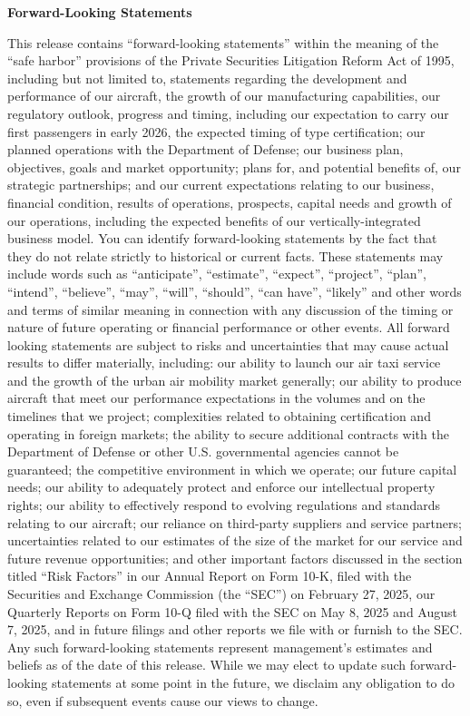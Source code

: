 \textbf{Forward-Looking Statements}\par\nobreak
This release contains ``forward-looking statements'' within the meaning of the ``safe harbor'' provisions of the Private Securities Litigation Reform Act of 1995, including but not limited to, statements regarding the development and performance of our aircraft, the growth of our manufacturing capabilities, our regulatory outlook, progress and timing, including our expectation to carry our first passengers in early 2026, the expected timing of type certification; our planned operations with the Department of Defense; our business plan, objectives, goals and market opportunity; plans for, and potential benefits of, our strategic partnerships; and our current expectations relating to our business, financial condition, results of operations, prospects, capital needs and growth of our operations, including the expected benefits of our vertically-integrated business model. You can identify forward-looking statements by the fact that they do not relate strictly to historical or current facts. These statements may include words such as ``anticipate'', ``estimate'', ``expect'', ``project'', ``plan'', ``intend'', ``believe'', ``may'', ``will'', ``should'', ``can have'', ``likely'' and other words and terms of similar meaning in connection with any discussion of the timing or nature of future operating or financial performance or other events. All forward looking statements are subject to risks and uncertainties that may cause actual results to differ materially, including: our ability to launch our air taxi service and the growth of the urban air mobility market generally; our ability to produce aircraft that meet our performance expectations in the volumes and on the timelines that we project; complexities related to obtaining certification and operating in foreign markets; the ability to secure additional contracts with the Department of Defense or other U.S. governmental agencies cannot be guaranteed; the competitive environment in which we operate; our future capital needs; our ability to adequately protect and enforce our intellectual property rights; our ability to effectively respond to evolving regulations and standards relating to our aircraft; our reliance on third-party suppliers and service partners; uncertainties related to our estimates of the size of the market for our service and future revenue opportunities; and other important factors discussed in the section titled ``Risk Factors'' in our Annual Report on Form 10-K, filed with the Securities and Exchange Commission (the ``SEC'') on February 27, 2025, our Quarterly Reports on Form 10-Q filed with the SEC on May 8, 2025 and August 7, 2025, and in future filings and other reports we file with or furnish to the SEC. Any such forward-looking statements represent management's estimates and beliefs as of the date of this release. While we may elect to update such forward-looking statements at some point in the future, we disclaim any obligation to do so, even if subsequent events cause our views to change.\par
\bigskip

